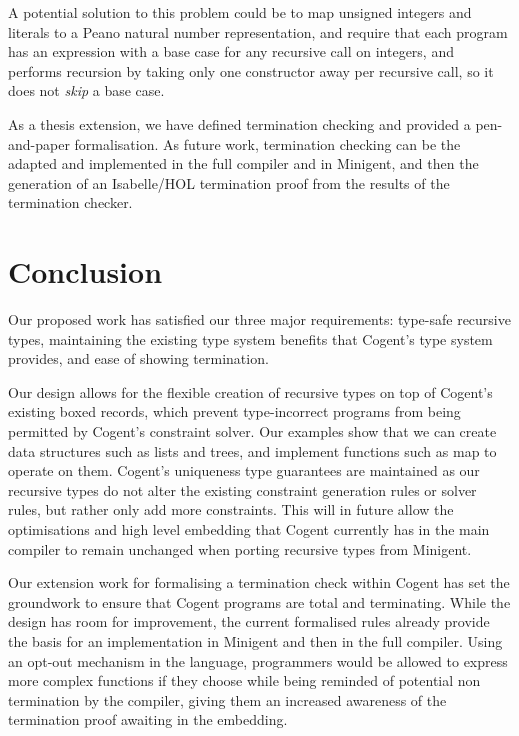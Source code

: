 A potential solution to this problem could be to map unsigned integers
and literals to a Peano natural number representation, and require that
each program has an expression with a base case for any recursive call
on integers, and performs recursion by taking only one constructor
away per recursive call, so it does not \emph{skip} a base case.

As a thesis extension, we have defined termination checking and provided
a pen-and-paper formalisation. As future work, termination checking can be
the adapted and implemented in the full compiler and in Minigent, and then
the generation of an Isabelle/HOL termination proof from the results
of the termination checker.

\section{Conclusion}

Our proposed work has satisfied our three major requirements: type-safe recursive types,
maintaining the existing type system benefits that Cogent's type system provides,
and ease of showing termination.

Our design allows for the flexible creation of recursive types on top of Cogent's existing
boxed records, which prevent type-incorrect programs from being permitted by Cogent's
constraint solver. Our examples show that we can create data structures such as lists
and trees, and implement functions such as \textsf{map} to operate on them. Cogent's
uniqueness type guarantees are maintained as our recursive types do not alter the existing
constraint generation rules or solver rules, but rather only add more constraints.
This will in future allow the optimisations and high level embedding
that Cogent currently has in the main compiler to remain unchanged
when porting recursive types from Minigent.

Our extension work for formalising a termination check within Cogent has set the groundwork
to ensure that Cogent programs are total and terminating. While the design has room for
improvement, the current formalised rules already provide the basis for an implementation
in Minigent and then in the full compiler. Using an opt-out mechanism in the language,
programmers would be allowed to express more complex functions if they choose while being reminded
of potential non termination by the compiler, giving them an increased awareness
of the termination proof awaiting in the embedding.